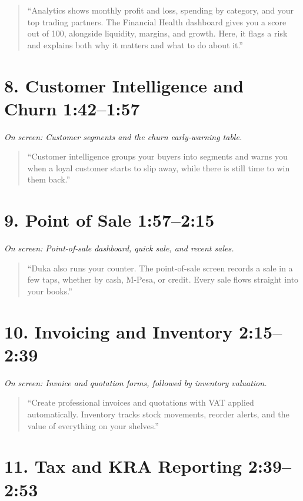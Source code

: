 \documentclass[11pt,a4paper]{article}
\newcommand{\timestamp}[1]{%
  \textcolor{dukablue}{\textbf{#1}}%
}
\newcommand{\screen}[1]{%
  \par\textit{\textcolor{mutedgray}{On screen: #1}}\par
}
\newcommand{\narration}[1]{%
  \begin{quote}
    \smallskip
    ``#1''
    \smallskip
  \end{quote}
}
\begin{document}
\narration{Analytics shows monthly profit and loss, spending
by category, and your top trading partners. The Financial
Health dashboard gives you a score out of 100, alongside
liquidity, margins, and growth. Here, it flags a risk and
explains both why it matters and what to do about it.}

\section*{8. Customer Intelligence and Churn \hfill
\small \timestamp{1:42--1:57}}

\screen{Customer segments and the churn early-warning table.}

\narration{Customer intelligence groups your buyers into
segments and warns you when a loyal customer starts to
slip away, while there is still time to win them back.}

\section*{9. Point of Sale \hfill
\small \timestamp{1:57--2:15}}

\screen{Point-of-sale dashboard, quick sale, and recent sales.}

\narration{Duka also runs your counter. The point-of-sale
screen records a sale in a few taps, whether by cash,
M-Pesa, or credit. Every sale flows straight into your books.}

\section*{10. Invoicing and Inventory \hfill
\small \timestamp{2:15--2:39}}

\screen{Invoice and quotation forms, followed by inventory
valuation.}

\narration{Create professional invoices and quotations with
VAT applied automatically. Inventory tracks stock movements,
reorder alerts, and the value of everything on your shelves.}

\section*{11. Tax and KRA Reporting \hfill
\small \timestamp{2:39--2:53}}
\end{document}
